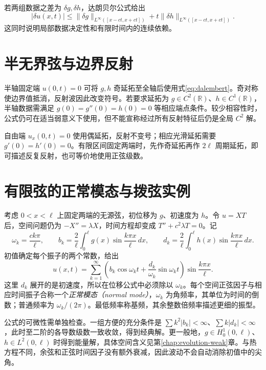 若两组数据之差为 $\delta g,\delta h$，达朗贝尔公式给出
\[
 |\delta u(x,t)|\le\|\delta g\|_{L^\infty([x-ct,x+ct])}
 +t\|\delta h\|_{L^\infty([x-ct,x+ct])}.
\]
这同时说明局部数据决定性和有限时间内的连续依赖。

\section{半无界弦与边界反射}
半轴固定端 $u(0,t)=0$ 可将 $g,h$ 奇延拓至全轴后使用式\eqref{eq:dalembert}。奇对称使边界值抵消，反射波因此改变符号。若要求延拓为 $g\in C^2(\mathbb R)$、$h\in C^1(\mathbb R)$，半轴数据需满足 $g(0)=g''(0)=h(0)=0$ 等相应端点条件。较少相容性时，公式仍可在适当弱意义下使用，但不能宣称经过所有反射特征后仍是全局 $C^2$ 解。

自由端 $u_x(0,t)=0$ 使用偶延拓，反射不变号；相应光滑延拓需要 $g'(0)=h'(0)=0$。有限区间固定两端时，先作奇延拓再作 $2\ell$ 周期延拓，即可描述反复反射，也可等价地使用正弦级数。

\section{有限弦的正常模态与拨弦实例}
\label{sec:finite-string}
考虑 $0<x<\ell$ 上固定两端的无源弦，初位移为 $g$、初速度为 $h$。令 $u=X T$ 后，空间问题仍为 $-X''=\lambda X$，时间方程却变成 $T''+c^2\lambda T=0$。记
\[
 \omega_k=\frac{ck\pi}{\ell},\qquad
 b_k=\frac2\ell\int_0^\ell g(x)\sin\frac{k\pi x}{\ell}\,dx,
 \qquad d_k=\frac2\ell\int_0^\ell h(x)\sin\frac{k\pi x}{\ell}\,dx.
\]
初值确定每个振子的两个常数，给出
\begin{equation}
 u(x,t)=\sum_{k=1}^\infty
 \left(b_k\cos\omega_kt+\frac{d_k}{\omega_k}\sin\omega_kt\right)
 \sin\frac{k\pi x}{\ell}.
 \label{eq:finite-wave-modes}
\end{equation}
这里 $d_k$ 展开的是初速度，所以在位移公式中必须除以 $\omega_k$。每个空间正弦因子与相应时间振子合称一个\emph{正常模态（normal mode）}，$\omega_k$ 为角频率，其单位为时间的倒数；普通频率为 $\omega_k/(2\pi)$。最低频率称基频，其余整数倍频率描述更细的振型。

公式的可微性需单独检查。一组方便的充分条件是 $\sum k^2|b_k|<\infty$、$\sum k|d_k|<\infty$，此时至二阶的各导数级数一致收敛，得到经典解。更一般地，$g\in H_0^1(0,\ell)$、$h\in L^2(0,\ell)$ 时得到能量解，具体空间含义见第\ref{chap:evolution-weak}章。与热方程不同，余弦和正弦时间因子没有额外衰减，因此波动不会自动消除初值中的尖角。

